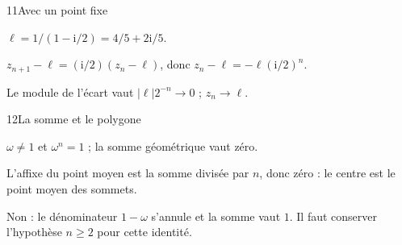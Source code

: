 \begin{corrige}{11}{Avec un point fixe}
\begin{questions}
\item $\ell=1/(1-\mathrm i/2)=4/5+2\mathrm i/5$.
\item $z_{n+1}-\ell=(\mathrm i/2)(z_n-\ell)$, donc $z_n-\ell=-\ell(\mathrm i/2)^n$.
\item Le module de l’écart vaut $|\ell|2^{-n}\to0$ ; $z_n\to\ell$.
\end{questions}
\end{corrige}
\begin{corrige}{12}{La somme et le polygone}
\begin{questions}
\item $\omega\ne1$ et $\omega^n=1$ ; la somme géométrique vaut zéro.
\item L’affixe du point moyen est la somme divisée par $n$, donc zéro : le centre est le point moyen des sommets.
\item Non : le dénominateur $1-\omega$ s’annule et la somme vaut $1$. Il faut conserver l’hypothèse $n\geq2$ pour cette identité.
\end{questions}
\end{corrige}
